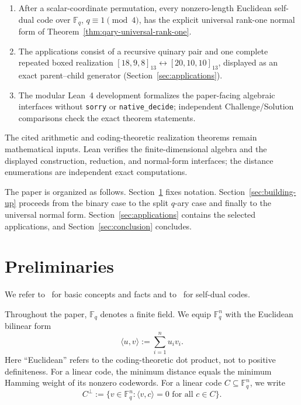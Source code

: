 \documentclass[12pt]{article}
\newcommand{\F}{\mathbb{F}}
\begin{document}
\begin{enumerate}[label=(\arabic*)]
\item After a scalar-coordinate permutation, every nonzero-length
Euclidean self-dual code over \(\F_q\), \(q\equiv1\pmod4\), has the explicit
universal rank-one normal form of
Theorem~\ref{thm:qary-universal-rank-one}.

\item The applications consist of a recursive quinary pair and one complete
repeated boxed realization
\([18,9,8]_{13}\leftrightarrow[20,10,10]_{13}\), displayed as an exact
parent--child generator (Section~\ref{sec:applications}).

\item The modular Lean~4 development formalizes the paper-facing algebraic
interfaces without \texttt{sorry} or \texttt{native\_decide}; independent
Challenge/Solution comparisons check the exact theorem statements.
\end{enumerate}

The cited arithmetic and coding-theoretic realization theorems remain
mathematical inputs. Lean verifies the finite-dimensional algebra and the
displayed construction, reduction, and normal-form interfaces; the distance
enumerations are independent exact computations.

The paper is organized as follows. Section~\ref{sec:background} fixes
notation. Section~\ref{sec:building-up} proceeds from the binary case to the
split \(q\)-ary case and finally to the universal normal form.
Section~\ref{sec:applications} contains the selected applications, and
Section~\ref{sec:conclusion} concludes.


\section{Preliminaries}
\label{sec:background}


We refer to~\cite{HuffmanPless} for basic concepts and facts and to~\cite{self-dual} for self-dual codes.

Throughout the paper, \(\F_q\) denotes a finite field. We equip \(\F_q^n\) with the Euclidean bilinear form
\[
\langle u,v\rangle := \sum_{i=1}^n u_i v_i.
\]
Here ``Euclidean'' refers to the coding-theoretic dot product, not to
positive definiteness. For a linear code, the minimum distance equals the
minimum Hamming weight of its nonzero codewords.
For a linear code $C \subseteq \F_q^n$, we write
\[
C^\perp := \{v \in \F_q^n : \langle v,c\rangle = 0 \text{ for all } c \in C\}.
\]
\end{document}
